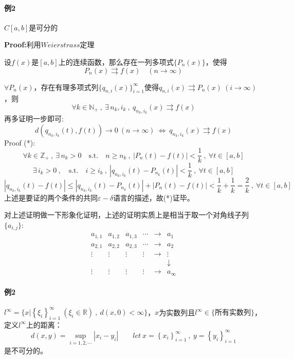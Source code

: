 \paragraph*{例2} \quad $C[a,b]$是可分的

\textbf{Proof:}利用$Weierstrass$定理
\begin{theorem}[$Weierstrass$定理]
    设$f(x)$是$[a,b]$上的连续函数，那么存在一列多项式$\{P_n(x)\}$，使得
    \[P_n(x) \rightrightarrows f(x) \quad (n \rightarrow \infty)\]
\end{theorem}
$\forall P_n(x)$，存在有理多项式列$\{q_{n,i}(x)\}_{i=1}^{\infty}$使得$q_{n,i}(x) \rightrightarrows P_n(x) \ (i \rightarrow \infty)$，则
\[\forall k \in \mathbb{N}_+ \ , \ \exists \, n_k,i_k \ , \ q_{n_k,i_k}(x) \rightrightarrows f(x)\]
再多证明一步即可:
\[d(q_{n_k,i_k}(t),f(t)) \rightarrow 0 \ (n \rightarrow \infty) \ \Leftrightarrow \ q_{n_k,i_k}(x) \rightrightarrows f(x) \tag{*}\]
Proof (*):
\[\forall k \in \mathbb{Z}_+ \ , \ \exists \, n_k>0 \quad \text{s.t.} \quad n \geq n_k \ , \ |P_n(t)-f(t)|<\frac{1}{k} \ , \ \forall t \in [a,b]\]
\[\exists \, i_k>0 \ , \quad \text{s.t.} \quad i \geq i_k \ , \ |q_{n_k,i_k}(t)-P_{n_k}(t)|<\frac{1}{k} \ , \ \forall t \in [a,b]\]
\[|q_{n_k,i_k}(t)-f(t)| \leq |q_{n_k,i_k}(t)-P_{n_k}(t)|+|P_n(t)-f(t)|<\frac{1}{k}+\frac{1}{k}=\frac{2}{k} \ , \ \forall t \in [a,b]\]
上述是要证的两个条件的共同$\varepsilon-\delta$语言的描述，故(*)证毕。

对上述证明做一下形象化证明，上述的证明实质上是相当于取一个对角线子列$\{a_{i,j}\}$:
\[
\begin{array}{cccccc}
    a_{1,1} & a_{1,2} & a_{1,3} & \cdots & \rightarrow & a_1 \\
    a_{2,1} & a_{2,2} & a_{2,3} & \cdots & \rightarrow & a_2 \\
    \vdots & \vdots & \vdots & \vdots & \rightarrow & \vdots \\
      &   &   &   &   & \downarrow \\
    \vdots & \vdots & \vdots & \vdots & \rightarrow & a_{\infty}
\end{array}    
\]

\paragraph*{例2} \quad $l^{\infty}=\{x|\left\{\xi_i\right\}_{i=1}^{\infty} \ (\xi_i \in \mathbb{R}) \ , \ d(x,0)<\infty\}$，$x$为实数列且$l^{\infty} \in \{\text{所有实数列}\}$，定义$l^{\infty}$上的距离：
\[d(x,y)=\mathop {\text{sup}}\limits_{i=1,2,\cdots}|x_i-y_i| \qquad let \ x=\left\{x_i\right\}_{i=1}^{\infty} \ , \ y=\left\{y_i\right\}_{i=1}^{\infty}\]
是不可分的。


